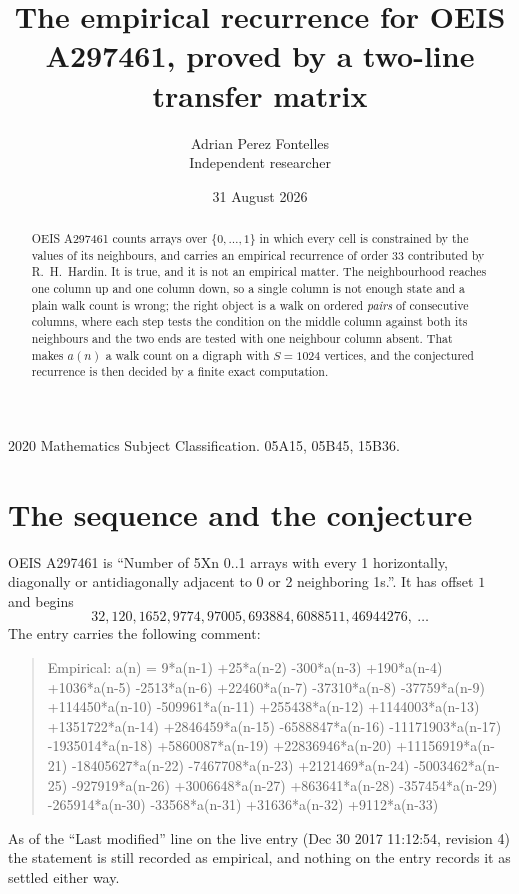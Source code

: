 \documentclass[11pt,a4paper]{article}
\title{The empirical recurrence for OEIS A297461, proved by a two-line transfer matrix}
\author{Adrian Perez Fontelles\\ \small Independent researcher}
\date{31 August 2026}
\theoremstyle{plain}
\theoremstyle{definition}
\begin{document}
\maketitle

\begin{abstract}
OEIS A297461 counts arrays over $\{0,\dots,1\}$ in which every cell is constrained by the
values of its neighbours, and carries an empirical recurrence of order $33$ contributed
by R.~H.~Hardin. It is true, and it is not an empirical matter. The neighbourhood reaches one
column up and one column down, so a single column is not enough state and a plain walk count
is wrong; the right object is a walk on ordered \emph{pairs} of consecutive columns, where
each step tests the condition on the middle column against both its neighbours and the two
ends are tested with one neighbour column absent. That makes $a(n)$ a walk count on a digraph
with $S=1024$ vertices, and the conjectured recurrence is then decided by a finite exact
computation.
\end{abstract}

\noindent\small 2020 Mathematics Subject Classification. 05A15, 05B45, 15B36.\normalsize

\section{The sequence and the conjecture}

OEIS A297461 is ``Number of 5Xn 0..1 arrays with every 1 horizontally, diagonally or antidiagonally adjacent to 0 or 2 neighboring 1s.''. It has offset $1$ and begins
\[
32, 120, 1652, 9774, 97005, 693884, 6088511, 46944276,\ \dots
\]
The entry carries the following comment:
\begin{quote}\small
Empirical: a(n) = 9*a(n-1) +25*a(n-2) -300*a(n-3) +190*a(n-4) +1036*a(n-5) -2513*a(n-6) +22460*a(n-7) -37310*a(n-8) -37759*a(n-9) +114450*a(n-10) -509961*a(n-11) +255438*a(n-12) +1144003*a(n-13) +1351722*a(n-14) +2846459*a(n-15) -6588847*a(n-16) -11171903*a(n-17) -1935014*a(n-18) +5860087*a(n-19) +22836946*a(n-20) +11156919*a(n-21) -18405627*a(n-22) -7467708*a(n-23) +2121469*a(n-24) -5003462*a(n-25) -927919*a(n-26) +3006648*a(n-27) +863641*a(n-28) -357454*a(n-29) -265914*a(n-30) -33568*a(n-31) +31636*a(n-32) +9112*a(n-33)
\end{quote}
As of the ``Last modified'' line on the live entry (Dec 30 2017 11:12:54, revision 4) the statement is
still recorded as empirical, and nothing on the entry records it as settled either way.
\end{document}

